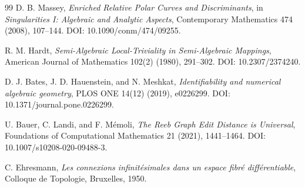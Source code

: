 \documentclass[11pt]{article}
\begin{document}
\begin{thebibliography}{99}
D. B. Massey,
\emph{Enriched Relative Polar Curves and Discriminants},
in \emph{Singularities I: Algebraic and Analytic Aspects},
Contemporary Mathematics 474 (2008), 107--144.
DOI: 10.1090/conm/474/09255.

R. M. Hardt,
\emph{Semi-Algebraic Local-Triviality in Semi-Algebraic Mappings},
American Journal of Mathematics 102(2) (1980), 291--302.
DOI: 10.2307/2374240.

D. J. Bates, J. D. Hauenstein, and N. Meshkat,
\emph{Identifiability and numerical algebraic geometry},
PLOS ONE 14(12) (2019), e0226299.
DOI: 10.1371/journal.pone.0226299.

U. Bauer, C. Landi, and F. M\'emoli,
\emph{The Reeb Graph Edit Distance is Universal},
Foundations of Computational Mathematics 21 (2021), 1441--1464.
DOI: 10.1007/s10208-020-09488-3.

C. Ehresmann,
\emph{Les connexions infinit\'esimales dans un espace fibr\'e
diff\'erentiable},
Colloque de Topologie, Bruxelles, 1950.

\end{thebibliography}
\end{document}

